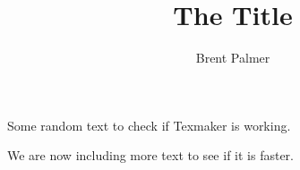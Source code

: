 \documentclass[]{article}
\title{The Title}
\author{Brent Palmer}
\begin{document}
\maketitle

Some random text to check if Texmaker is working.

We are now including more text to see if it is faster.
\end{document}
